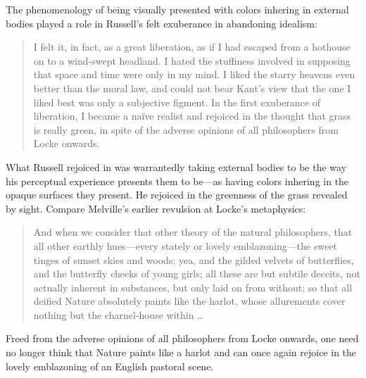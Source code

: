 \documentclass[12pt]{article}
\begin{document}
The phenomenology of being visually presented with colors inhering in external bodies played a role in Russell's felt exuberance in abandoning idealism:
\begin{quote}
	I felt it, in fact, as a great liberation, as if I had escaped from a hothouse on to a wind-swept headland. I hated the stuffiness involved in supposing that space and time were only in my mind. I liked the starry heavens even better than the moral law, and could not bear Kant’s view that the one I liked best was only a subjective figment. In the first exuberance of liberation, I became a naïve realist and rejoiced in the thought that grass is really green, in spite of the adverse opinions of all philosophers from Locke onwards. \citep[48]{Russell:1959fv}
\end{quote}
What Russell rejoiced in was warrantedly taking external bodies to be the way his perceptual experience presents them to be---as having colors inhering in the opaque surfaces they present. He rejoiced in the greenness of the grass revealed by sight. Compare Melville's earlier revulsion at Locke's metaphysics:
\begin{quote}
	And when we consider that other theory of the natural philosophers, that all other earthly hues---every stately or lovely emblazoning---the sweet tinges of sunset skies and woods; yea, and the gilded velvets of butterflies, and the butterfly cheeks of young girls; all these are but subtile deceits, not actually inherent in substances, but only laid on from without; so that all deified Nature absolutely paints like the harlot, whose allurements cover nothing but the charnel-house within \ldots\ \citep[ch. 42]{Melville:1851ms}
\end{quote}
Freed from the adverse opinions of all philosophers from Locke onwards, one need no longer think that Nature paints like a harlot and can once again rejoice in the lovely emblazoning of an English pastoral scene.
\end{document}
